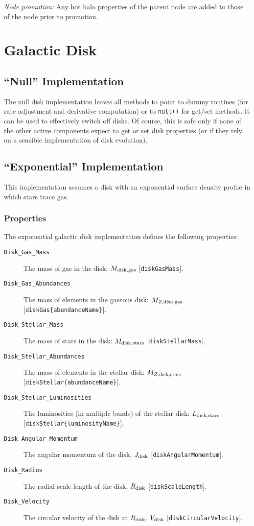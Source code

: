 \noindent\emph{Node promotion:} Any hot halo properties of the parent node are added to those of the node prior to promotion.\\

\section{Galactic Disk}

\subsection{``Null'' Implementation}

The null disk implementation leaves all methods to point to dummy routines (for rate adjustment and derivative computation) or to {\tt null()} for get/set methods. It can be used to effectively switch off disks. Of course, this is safe only if none of the other active components expect to get or set disk properties (or if they rely on a sensible implementation of disk evolution).

\subsection{``Exponential'' Implementation}\label{sec:DiskExponential}

This implementation assumes a disk with an exponential surface density profile in which stars trace gas.

\subsubsection{Properties}

The exponential galactic disk implementation defines the following properties:
\begin{description}
 \item [{\tt Disk\_Gas\_Mass}] The mass of gas in the disk: $M_{\rm disk, gas}$ [{\tt diskGasMass}].
 \item [{\tt Disk\_Gas\_Abundances}] The mass of elements in the gaseous disk: $M_{Z, {\rm disk, gas}}$ [{\tt diskGas\{abundanceName\}}].
 \item [{\tt Disk\_Stellar\_Mass}] The mass of stars in the disk: $M_{\rm disk, stars}$ [{\tt diskStellarMass}].
 \item [{\tt Disk\_Stellar\_Abundances}] The mass of elements in the stellar disk: $M_{Z, {\rm disk, stars}}$ [{\tt diskStellar\{abundanceName\}}].
 \item [{\tt Disk\_Stellar\_Luminosities}] The luminosities (in multiple bands) of the stellar disk: $L_{\rm disk, stars}$ [{\tt diskStellar\{luminosityName\}}].
 \item [{\tt Disk\_Angular\_Momentum}] The angular momentum of the disk, $J_{\rm disk}$ [{\tt diskAngularMomentum}].
 \item [{\tt Disk\_Radius}] The radial scale length of the disk, $R_{\rm disk}$ [{\tt diskScaleLength}].
 \item [{\tt Disk\_Velocity}] The circular velocity of the disk at $R_{\rm disk}$, $V_{\rm disk}$ [{\tt diskCircularVelocity}].
\end{description}

